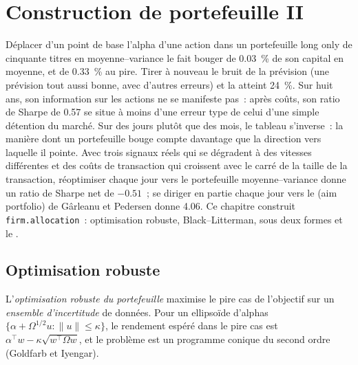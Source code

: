 \chapter{Construction de portefeuille II}\label{ch:rs:portfolio-construction-ii}

Déplacer d'un point de base l'alpha d'une action dans un portefeuille long only de cinquante titres en moyenne--variance le fait bouger de 0.03~\% de son capital en moyenne, et de 0.33~\% au
pire. Tirer à nouveau le bruit de la prévision (une prévision tout aussi bonne, avec d'autres erreurs) et la  atteint 24~\%. Sur huit ans, son
information sur les actions ne se manifeste pas~: après coûts, son ratio de Sharpe de 0.57 se situe à moins d'une erreur type de celui d'une simple détention du marché. Sur des jours plutôt
que des mois, le tableau s'inverse~: la manière dont un portefeuille bouge compte davantage que la direction vers laquelle il pointe. Avec trois signaux réels qui se dégradent à des vitesses différentes et des coûts de
transaction qui croissent avec le carré de la taille de la transaction, réoptimiser chaque jour vers le portefeuille moyenne--variance donne un ratio de Sharpe net de $-0.51$~; se diriger en partie
chaque jour vers le  (aim portfolio) de Gârleanu et Pedersen donne 4.06. Ce chapitre construit \texttt{firm.allocation}~: optimisation robuste, Black--Litterman,
 sous deux formes et le .

\section{Optimisation robuste}

\begin{definition}\label{def:rs:portfolio-construction-ii:robust}
L'\emph{optimisation robuste du portefeuille} maximise le pire cas de l'objectif sur un \emph{ensemble
d'incertitude} de données. Pour un ellipsoïde d'alphas $\{\alpha + \Omega^{1/2}u : \lVert u\rVert \le \kappa\}$, le rendement espéré dans le pire cas est
$\alpha^\top w - \kappa\sqrt{w^\top\Omega w}$, et le problème est un programme conique du second ordre (Goldfarb et Iyengar).
\end{definition}

